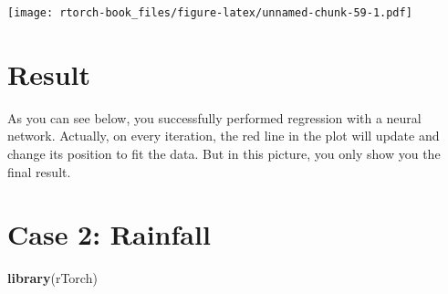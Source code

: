 \documentclass[]{book}
\newenvironment{Shaded}{\begin{snugshade}}{\end{snugshade}}
\newcommand{\CommentTok}[1]{\textcolor[rgb]{0.56,0.35,0.01}{\textit{#1}}}
\newcommand{\ControlFlowTok}[1]{\textcolor[rgb]{0.13,0.29,0.53}{\textbf{#1}}}
\newcommand{\DataTypeTok}[1]{\textcolor[rgb]{0.13,0.29,0.53}{#1}}
\newcommand{\DecValTok}[1]{\textcolor[rgb]{0.00,0.00,0.81}{#1}}
\newcommand{\KeywordTok}[1]{\textcolor[rgb]{0.13,0.29,0.53}{\textbf{#1}}}
\newcommand{\NormalTok}[1]{#1}
\newcommand{\OperatorTok}[1]{\textcolor[rgb]{0.81,0.36,0.00}{\textbf{#1}}}
\newcommand{\StringTok}[1]{\textcolor[rgb]{0.31,0.60,0.02}{#1}}
\begin{document}
\texttt{[image: rtorch-book\_files/figure-latex/unnamed-chunk-59-1.pdf]}

\begin{Shaded}
\end{Shaded}

\hypertarget{result}{%
\section{Result}\label{result}}

As you can see below, you successfully performed regression with a neural network. Actually, on every iteration, the red line in the plot will update and change its position to fit the data. But in this picture, you only show you the final result.

\hypertarget{case-2-rainfall}{%
\section{Case 2: Rainfall}\label{case-2-rainfall}}

\begin{Shaded}
\begin{Highlighting}[]
\KeywordTok{library}\NormalTok{(rTorch)}
\end{Highlighting}
\end{Shaded}
\end{document}
